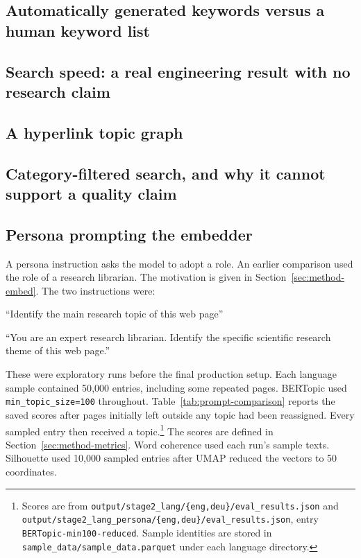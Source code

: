\subsection{Automatically generated keywords versus a human keyword list}
\label{sec:setaside-keywords}

\subsection{Search speed: a real engineering result with no research claim}
\label{sec:setaside-speed}

\subsection{A hyperlink topic graph}
\label{sec:setaside-graph}

\subsection{Category-filtered search, and why it cannot support a quality claim}
\label{sec:setaside-utility}

\subsection{Persona prompting the embedder}
\label{sec:setaside-persona}

A persona instruction asks the model to adopt a role. An earlier comparison used the role of
a research librarian. The motivation is given in Section~\ref{sec:method-embed}. The two
instructions were:

\begin{description}[leftmargin=1.3em,style=nextline,itemsep=3pt]
\item[Original.] ``Identify the main research topic of this web page''
\item[Librarian.] ``You are an expert research librarian. Identify the specific scientific
research theme of this web page.''
\end{description}

These were exploratory runs before the final production setup. Each language sample contained
50{,}000 entries, including some repeated pages. BERTopic used
\texttt{min\_topic\_size=100} throughout. Table~\ref{tab:prompt-comparison} reports the saved scores after
pages initially left outside any topic had been reassigned. Every sampled entry then received
a topic.\footnote{\raggedright Scores are from
\texttt{output/stage2\_lang/}\allowbreak\texttt{\{eng,deu\}/}\allowbreak\texttt{eval\_results.json}
and \texttt{output/stage2\_lang\_persona/}\allowbreak\texttt{\{eng,deu\}/}\allowbreak\texttt{eval\_results.json},
entry \texttt{BERTopic-min100-reduced}. Sample identities are stored in
\texttt{sample\_data/sample\_data.parquet} under each language directory.}
The scores are defined in Section~\ref{sec:method-metrics}. Word coherence used each run's
sample texts. Silhouette used 10{,}000 sampled entries after UMAP reduced the vectors to
50 coordinates.

